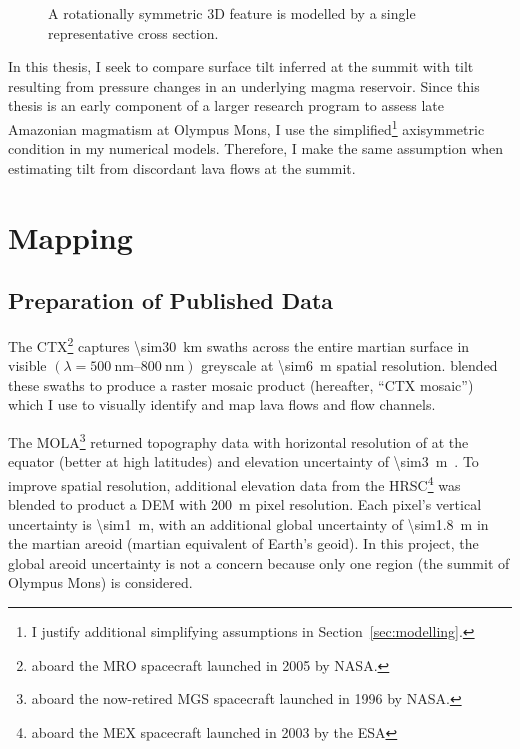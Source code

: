 \begin{figure}
    \caption[Axisymmetric model geometry]{A rotationally symmetric 3D feature is modelled by a single representative cross section.}%
    \label{fig:axisymmetry}
\end{figure}    

In this thesis, I seek to compare surface tilt inferred at the summit with tilt resulting from pressure changes in an underlying magma reservoir. Since this thesis is an early component of a larger research program to assess late Amazonian magmatism at Olympus Mons, I use the simplified\footnote{I justify additional simplifying assumptions in Section~\ref{sec:modelling}.} axisymmetric condition in my numerical models. Therefore, I make the same assumption when estimating tilt from discordant lava flows at the summit.

\section{Mapping}\label{sec:mapping}
\subsection{Preparation of Published Data}

The \acf{CTX}\footnote{aboard the \ac{MRO} spacecraft launched in 2005 by \acs{NASA}.} captures \qty{\sim30}{\km} swaths across the entire martian surface in visible $(\lambda=\qtyrange{500}{800}{\nm})$ greyscale at \qty{\sim6}{\m} spatial resolution. \textcite{Dickson2018AGB} blended these swaths to produce a raster mosaic product (hereafter, ``\ac{CTX} mosaic'') which I use to visually identify and map lava flows and flow channels.

The \acf{MOLA}\footnote{aboard the now-retired \ac{MGS} spacecraft launched in 1996 by \acs{NASA}.} returned topography data with horizontal resolution of  at the equator (better at high latitudes) and elevation uncertainty of \qty{\sim3}{\m}~\parencite{smith_mars_2001}. To improve spatial resolution, additional elevation data from the \ac{HRSC}\footnote{aboard the \ac{MEX} spacecraft launched in 2003 by the \ac{ESA}} was blended to product a \ac{DEM} with \qty{200}{\m} pixel resolution. Each pixel's vertical uncertainty is \qty{\sim1}{\m}, with an additional global uncertainty of \qty{\sim1.8}{\m} in the martian areoid (martian equivalent of Earth's geoid). In this project, the global areoid uncertainty is not a concern because only one region (the summit of Olympus Mons) is considered.

